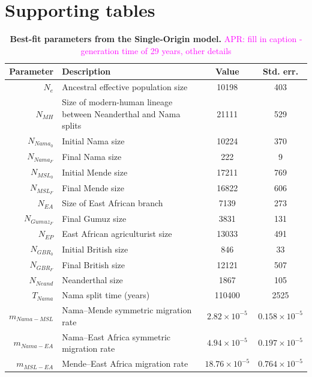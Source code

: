 \documentclass[]{article}
\newcommand{\aprcomment}[1]{{\textcolor{magenta}{APR: #1}}}
\begin{document}



\clearpage

\section*{Supporting tables}

\begin{table}[ht]
\caption{
    \label{tab:single_origin}
    \textbf{Best-fit parameters from the Single-Origin model.}
    \aprcomment{fill in caption - generation time of 29 years, other details}
}
\centering
\begin{tabular}[t]{rP{8cm}cc}
    \toprule
    Parameter & Description & Value & Std. err.\\
    \midrule
    $N_e$ & Ancestral effective population size & 10198 & 403 \\
    $N_{MH}$ & Size of modern-human lineage between Neanderthal and Nama splits & 21111 & 529 \\
    $N_{Nama_0}$ & Initial Nama size & 10224 & 370 \\
    $N_{Nama_F}$ & Final Nama size & 222 & 9 \\
    $N_{MSL_0}$ & Initial Mende size & 17211 & 769 \\
    $N_{MSL_F}$ & Final Mende size & 16822 & 606 \\
    $N_{EA}$ & Size of East African branch & 7139 & 273 \\
    $N_{Gumuz_F}$ & Final Gumuz size & 3831 & 131 \\
    $N_{EP}$ & East African agriculturist size & 13033 & 491 \\
    $N_{GBR_0}$ & Initial British size & 846 & 33 \\
    $N_{GBR_F}$ & Final British size & 12121 & 507 \\
    $N_{Neand}$ & Neanderthal size & 1867 & 105 \\
    $T_{Nama}$ & Nama split time (years) & 110400 & 2525 \\
    $m_{Nama-MSL}$ & Nama--Mende symmetric migration rate & $2.82\times10^{-5}$ & $0.158\times10^{-5}$ \\
    $m_{Nama-EA}$ & Nama--East Africa symmetric migration rate & $4.94\times10^{-5}$ & $0.197\times10^{-5}$ \\
    $m_{MSL-EA}$ & Mende--East Africa migration rate & $18.76\times10^{-5}$ & $0.764\times10^{-5}$ \\

\end{tabular}
\end{table}
\end{document}

